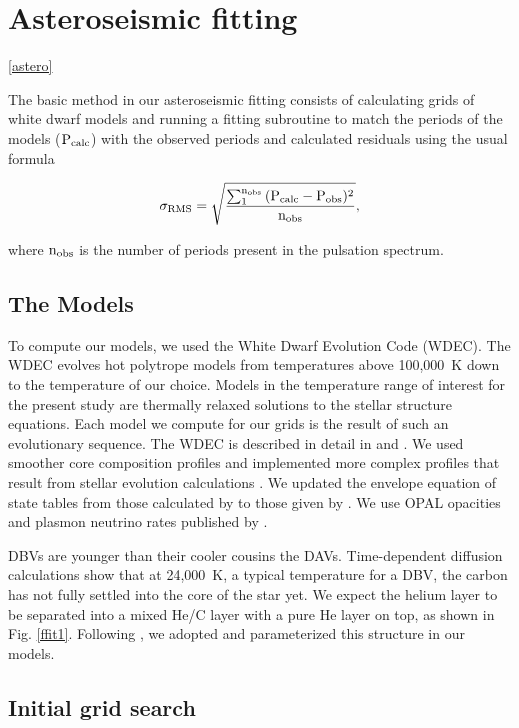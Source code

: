 \documentclass[12pt,preprint]{aastex}
\begin{document}
\section{Asteroseismic fitting}\ref{astero}
\label{fitting}

The basic method in our asteroseismic fitting consists of calculating grids of white dwarf models and 
running a fitting subroutine to match the periods of the models ($\rm P_{calc}$) with the observed 
periods and calculated residuals using the usual formula

\begin{equation}
\label{fiteq1}
\rm \sigma_{RMS} = \sqrt{\frac{\sum_{1}^{n_{obs}} {(P_{calc}-P_{obs})^2}}{n_{obs}}},
\end{equation}

\noindent where $\rm n_{obs}$ is the number of periods present in the pulsation spectrum.

\subsection{The Models}
\label{models}

To compute our models, we used the White Dwarf Evolution Code (WDEC). The WDEC evolves hot 
polytrope models from temperatures above 100{,}000~K down to the temperature of our choice. 
Models in the temperature range of interest for the present study are thermally relaxed 
solutions to the stellar structure equations. Each model we compute for our grids is the result 
of such an evolutionary sequence. The WDEC is described in detail in \citet{Lamb75} and 
\citet{Wood90}. We used smoother core composition profiles and implemented more complex profiles 
that result from stellar evolution calculations \citep{Salaris97}. We updated the envelope 
equation of state tables from those calculated by \citet{Fontaine77} to those given by 
\citet{Saumon95}. We use OPAL opacities \citep{Iglesias96} and plasmon neutrino rates 
published by \citet{Itoh96}. 

DBVs are younger than their cooler cousins the DAVs. Time-dependent diffusion calculations 
\citep[e.g.][]{Dehner95,Althaus05} show that at 24{,}000~K, a typical temperature for a DBV, 
the carbon has not fully settled into the core of the star yet. We expect the helium layer to 
be separated into a mixed He/C layer with a pure He layer on top, as shown in Fig. \ref{ffit1}. 
Following  \citet{Metcalfe05a}, we adopted and parameterized this structure in our models. 

\subsection{Initial grid search}
\label{grids}
\end{document}
